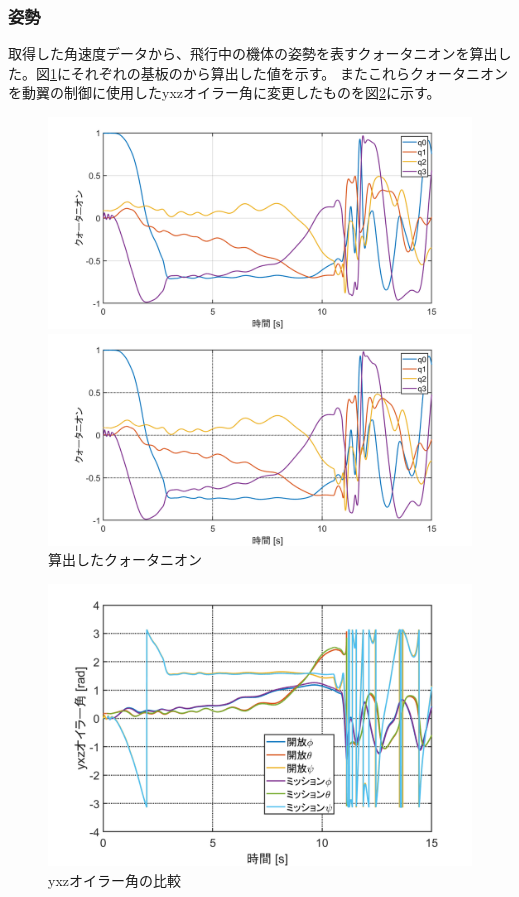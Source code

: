 \documentclass[a4paper,11pt,titlepage,uplatex]{jsarticle}
\begin{document}
\subsubsection{姿勢}
取得した角速度データから、飛行中の機体の姿勢を表すクォータニオンを算出した。図\ref{fig:quatarnionhikaku}にそれぞれの基板のから算出した値を示す。
またこれらクォータニオンを動翼の制御に使用したyxzオイラー角に変更したものを図\ref{fig:oirahikaku}に示す。

\begin{figure}[H]
    \centering
    \begin{minipage}{.85\textwidth}
        \centering
        \includegraphics[width=0.95\linewidth]{pic_sim/qua_no_s.png}
        \hspace{16mm}{\small［1］開放基板}

        \includegraphics[width=0.95\linewidth]{pic_sim/qua_ta_s.png}
        \hspace{16mm}{\small［2］ミッション基板}
    \end{minipage}
    \caption{算出したクォータニオン}
    \label{fig:quatarnionhikaku}
\end{figure}

\begin{figure}[H]
    \centering
    \includegraphics[width=0.65\linewidth]{pic_sim/euler2.png}
    \caption{yxzオイラー角の比較}
    \label{fig:oirahikaku}
\end{figure}
\end{document}
